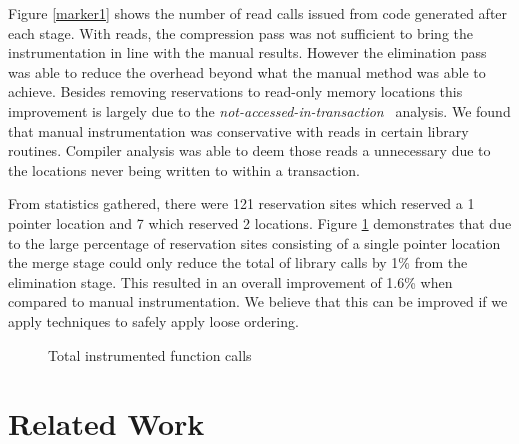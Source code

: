 \documentclass[preprint]{sigplanconf}
\begin{document}
Figure \ref{marker1} shows the number of read calls issued from code generated after each stage. With reads, the compression pass was not sufficient to bring the instrumentation in line with the manual results. However the elimination pass was able to reduce the overhead beyond what the manual method was able to achieve. Besides removing reservations to read-only memory locations this improvement is largely due to the \emph{not-accessed-in-transaction}~\cite{Shpeisman:2007:EIO:1250734.1250744} analysis. We found that manual instrumentation was conservative with reads in certain library routines. Compiler analysis was able to deem those reads a unnecessary due to the locations never being written to within a transaction.

From statistics gathered, there were 121 reservation sites which reserved a 1 pointer location and 7 which reserved 2 locations. Figure \ref{marker2} demonstrates that due to the large percentage of reservation sites consisting of a single pointer location the merge stage could only reduce the total of library calls by 1\% from the elimination stage. This resulted in an overall improvement of 1.6\% when compared to manual instrumentation. We believe that this can be improved if we apply techniques to safely apply loose ordering.

\begin{figure}
\caption{Total instrumented function calls}\label{marker2}
\end{figure}

\section{Related Work}
\end{document}
